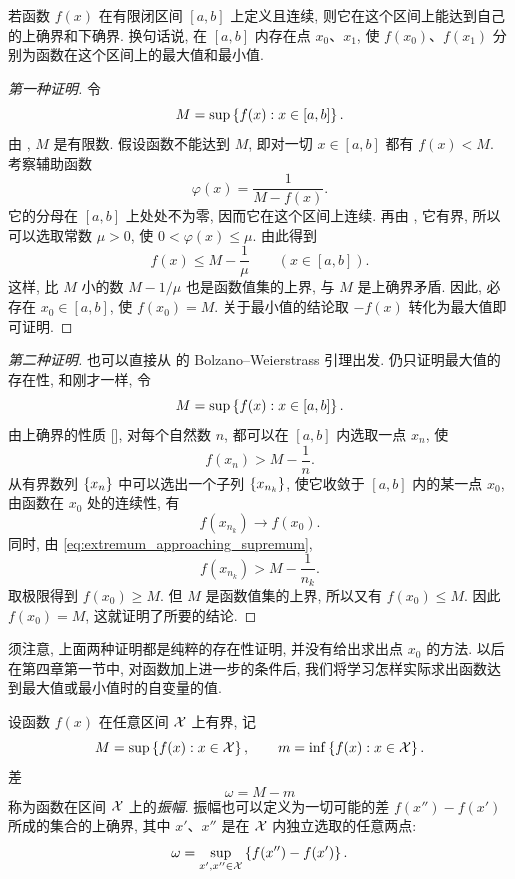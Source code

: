 \begin{namedtheorem}\label{thm:weierstrass_extrema}
若函数 $f(x)$ 在有限闭区间 $[a,b]$ 上定义且连续,
则它在这个区间上能达到自己的上确界和下确界.
换句话说, 在 $[a,b]$ 内存在点 $x_0$、$x_1$,
使 $f(x_0)$、$f(x_1)$ 分别为函数在这个区间上的最大值和最小值.
\end{namedtheorem}

\begin{proof}[第一种证明]
令
$$
M=\sup\left\{ f(x):x\in[a,b] \right\}.
$$
由 , $M$ 是有限数.
假设函数不能达到 $M$, 即对一切 $x\in[a,b]$ 都有 $f(x)<M$.
考察辅助函数
$$
\varphi(x)=\frac1{M-f(x)}.
$$
它的分母在 $[a,b]$ 上处处不为零, 因而它在这个区间上连续.
再由 , 它有界, 所以可以选取常数 $\mu>0$, 使
$
0<\varphi(x)\leq\mu.
$
由此得到
$$
f(x)\leq M-\frac1\mu\qquad(x\in[a,b]).
$$
这样, 比 $M$ 小的数 $M-1/\mu$ 也是函数值集的上界,
与 $M$ 是上确界矛盾.
因此, 必存在 $x_0\in[a,b]$, 使 $f(x_0)=M$.
关于最小值的结论取 $-f(x)$ 转化为最大值即可证明.
\end{proof}

\begin{proof}[第二种证明]
也可以直接从  的 Bolzano--Weierstrass 引理出发.
仍只证明最大值的存在性, 和刚才一样, 令
$$
M=\sup\left\{ f(x):x\in[a,b] \right\}.
$$
由上确界的性质 [], 对每个自然数 $n$,
都可以在 $[a,b]$ 内选取一点 $x_n$, 使
\begin{equation}\label{eq:extremum_approaching_supremum}
f(x_n)>M-\frac1n.
\end{equation}
从有界数列 $\{x_{n}\}$ 中可以选出一个子列 $\left\{ x_{n_k} \right\}$,
使它收敛于 $[a,b]$ 内的某一点 $x_0$,
由函数在 $x_0$ 处的连续性, 有
$$
f(x_{n_k})\to f(x_0).
$$
同时, 由 \eqref{eq:extremum_approaching_supremum},
$$
f(x_{n_k})>M-\frac1{n_k}.
$$
取极限得到 $f(x_0)\geq M$.
但 $M$ 是函数值集的上界, 所以又有 $f(x_0)\leq M$.
因此 $f(x_0)=M$, 这就证明了所要的结论.
\end{proof}

须注意, 上面两种证明都是纯粹的存在性证明,
并没有给出求出点 $x_0$ 的方法.
以后在第四章第一节中, 对函数加上进一步的条件后,
我们将学习怎样实际求出函数达到最大值或最小值时的自变量的值.

\label{def:function_oscillation}
设函数 $f(x)$ 在任意区间 $\mathcal{X}$ 上有界, 记
$$
M=\sup\left\{ f(x):x\in\mathcal{X} \right\},\qquad
m=\inf\left\{ f(x):x\in\mathcal{X} \right\}.
$$
差
$$
\omega=M-m
$$
称为函数在区间 $\mathcal{X}$ 上的\emph{振幅}.
振幅也可以定义为一切可能的差 $f(x'')-f(x')$ 所成的集合的上确界,
其中 $x'$、$x''$ 是在 $\mathcal{X}$ 内独立选取的任意两点:
$$
\omega=\sup_{x',x''\in\mathcal{X}}\left\{ f(x'')-f(x') \right\}.
$$

